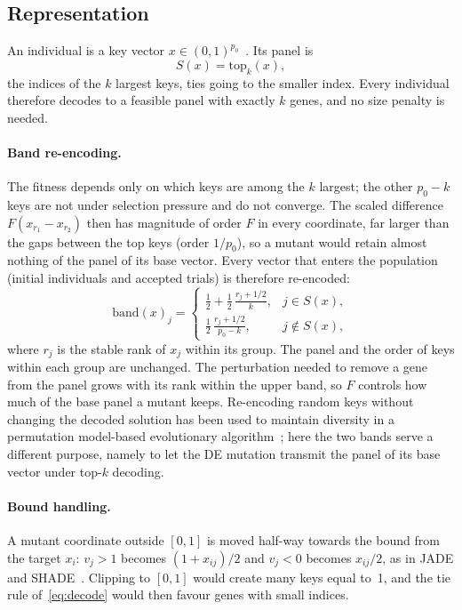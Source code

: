 \subsection{Representation}\label{sec:representation}

An individual is a key vector $x\in(0,1)^{p_0}$~\cite{bean1994}. Its panel is
\begin{equation}\label{eq:decode}
  S(x)=\mathrm{top}_k(x),
\end{equation}
the indices of the $k$ largest keys, ties going to the smaller index. Every individual therefore decodes to a feasible panel
with exactly $k$ genes, and no size penalty is needed.

\paragraph{Band re-encoding.} The fitness depends only on which keys are among the $k$ largest; the other $p_0-k$ keys are not
under selection pressure and do not converge. The scaled difference $F(x_{r_1}-x_{r_2})$ then has magnitude of order $F$ in
every coordinate, far larger than the gaps between the top keys (order $1/p_0$), so a mutant would retain almost nothing of the
panel of its base vector. Every vector that enters the population (initial individuals and accepted trials) is therefore
re-encoded:
\begin{equation}\label{eq:band}
  \mathrm{band}(x)_j=
  \begin{cases}
    \tfrac12+\tfrac12\,\frac{r_j+1/2}{k}, & j\in S(x),\\[2pt]
    \tfrac12\,\frac{r_j+1/2}{p_0-k}, & j\notin S(x),
  \end{cases}
\end{equation}
where $r_j$ is the stable rank of $x_j$ within its group. The panel and the order of keys within each group are unchanged. The
perturbation needed to remove a gene from the panel grows with its rank within the upper band, so $F$ controls how much of the
base panel a mutant keeps. Re-encoding random keys without changing the decoded solution has been used to maintain diversity in a
permutation model-based evolutionary algorithm~\cite{bosman2016}; here the two bands serve a different purpose, namely to let the
DE mutation transmit the panel of its base vector under top-$k$ decoding.

\paragraph{Bound handling.} A mutant coordinate outside $[0,1]$ is moved half-way towards the bound from the target $x_i$:
$v_j>1$ becomes $(1+x_{ij})/2$ and $v_j<0$ becomes $x_{ij}/2$, as in JADE and SHADE~\cite{zhang2009,tanabe2013}. Clipping to
$[0,1]$ would create many keys equal to~1, and the tie rule of~\eqref{eq:decode} would then favour genes with small indices.

